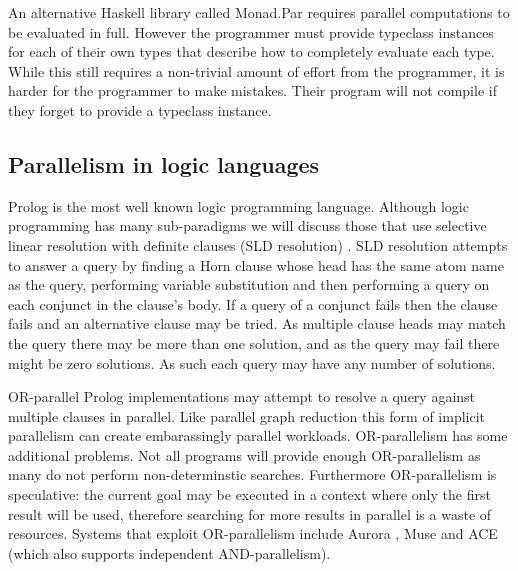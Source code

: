 An alternative Haskell library called Monad.Par \citep{marlow:monadpar}
requires parallel computations to be evaluated in full.
However the programmer must provide typeclass instances for each of their
own types that describe how to completely evaluate each type.
While this still requires a non-trivial amount of effort from the
programmer,
it is harder for the programmer to make mistakes.
Their program will not compile if they forget to provide a typeclass
instance.

\subsection{Parallelism in logic languages}
\label{sec:intro_par_logic}

Prolog is the most well known logic programming language.
Although logic programming has many sub-paradigms we will discuss
those that use selective linear resolution with definite clauses
(SLD resolution) \citep{kowalski_sld}.
SLD resolution attempts to answer a query by finding a Horn clause whose
head has the same atom name as the query,
performing variable substitution and then performing a query on each
conjunct in the clause's body.
If a query of a conjunct fails then the clause fails and an alternative
clause may be tried.
As multiple clause heads may match the query there may be more than one
solution,
and as the query may fail there might be zero solutions.
As such each query may have any number of solutions.

OR-parallel Prolog implementations may attempt to resolve a query against
multiple clauses in parallel.
Like parallel graph reduction this form of implicit parallelism can create
embarassingly parallel workloads.
OR-parallelism has some additional problems.
Not all programs will provide enough OR-parallelism as many do not perform
non-determinstic searches.
Furthermore OR-parallelism is speculative:
the current goal may be executed in a context where only the first result
will be used,
therefore searching for more results in parallel is a waste of resources.
Systems that exploit OR-parallelism include
Aurora \citep{lusk:1990:aurora},
Muse \citep{ali:1990:muse}
and ACE \citep{gupta:1991:ace} (which also supports independent AND-parallelism).

